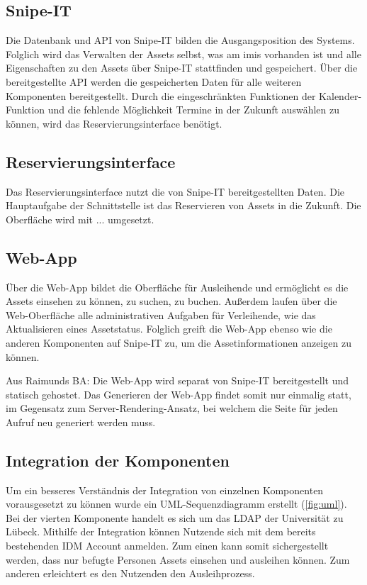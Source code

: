 \subsection{Snipe-IT}
Die Datenbank und API von Snipe-IT bilden die Ausgangsposition des Systems. Folglich wird das
Verwalten der Assets selbst, was am \ac{imis} vorhanden ist und alle Eigenschaften zu den Assets
über Snipe-IT stattfinden und gespeichert. Über die bereitgestellte API werden die gespeicherten
Daten für alle weiteren Komponenten bereitgestellt. Durch die eingeschränkten Funktionen der
Kalender-Funktion und die fehlende Möglichkeit Termine in der Zukunft auswählen zu können, wird das
Reservierungsinterface benötigt.

\subsection{Reservierungsinterface}
Das Reservierungsinterface nutzt die von Snipe-IT bereitgestellten Daten. Die Hauptaufgabe der
Schnittstelle ist das Reservieren von Assets in die Zukunft. Die Oberfläche wird mit ... umgesetzt.

\subsection{Web-App}
Über die Web-App bildet die Oberfläche für Ausleihende und ermöglicht es die Assets einsehen zu
können, zu suchen, zu buchen. Außerdem laufen über die Web-Oberfläche alle administrativen Aufgaben
für Verleihende, wie das Aktualisieren eines Assetstatus. Folglich greift die Web-App ebenso wie die
anderen Komponenten auf Snipe-IT zu, um die Assetinformationen anzeigen zu können. 

Aus Raimunds BA: Die Web-App wird separat von Snipe-IT bereitgestellt und statisch gehostet. Das
Generieren der Web-App findet somit nur einmalig statt, im Gegensatz zum Server-Rendering-Ansatz,
bei welchem die Seite für jeden Aufruf neu generiert werden muss.

\subsection{Integration der Komponenten}
Um ein besseres Verständnis der Integration von einzelnen Komponenten vorausgesetzt zu können wurde
ein UML-Sequenzdiagramm erstellt (\ref{fig:uml}). Bei der vierten Komponente handelt es sich um das
LDAP der Universität zu Lübeck. Mithilfe der Integration können Nutzende sich mit dem bereits
bestehenden IDM Account anmelden. Zum einen kann somit sichergestellt werden, dass nur befugte
Personen Assets einsehen und ausleihen können. Zum anderen erleichtert es den Nutzenden den
Ausleihprozess.

